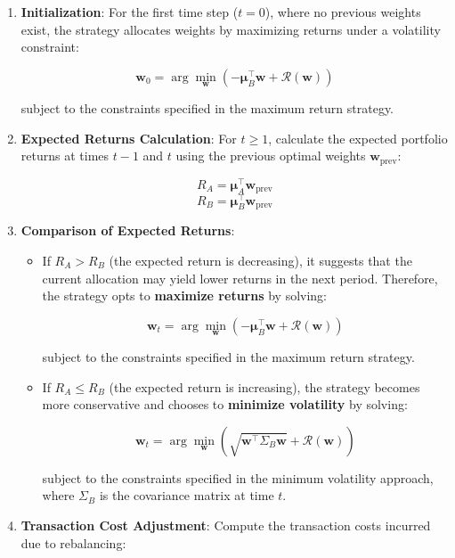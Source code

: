\begin{enumerate}
    \item \textbf{Initialization}: For the first time step (\( t = 0 \)), where no previous weights exist, the strategy allocates weights by maximizing returns under a volatility constraint:

    \[
    \mathbf{w}_0 = \arg\min_{\mathbf{w}} \left( -\boldsymbol{\mu}_B^\top \mathbf{w} + \mathcal{R}(\mathbf{w}) \right)
    \]
    
    subject to the constraints specified in the maximum return strategy.

    \item \textbf{Expected Returns Calculation}: For \( t \geq 1 \), calculate the expected portfolio returns at times \( t-1 \) and \( t \) using the previous optimal weights \( \mathbf{w}_{\text{prev}} \):

    \[
    R_A = \boldsymbol{\mu}_A^\top \mathbf{w}_{\text{prev}}
    \]
    \[
    R_B = \boldsymbol{\mu}_B^\top \mathbf{w}_{\text{prev}}
    \]

    \item \textbf{Comparison of Expected Returns}:
    \begin{itemize}
        \item If \( R_A > R_B \) (the expected return is decreasing), it suggests that the current allocation may yield lower returns in the next period. Therefore, the strategy opts to \textbf{maximize returns} by solving:

        \[
        \mathbf{w}_t = \arg\min_{\mathbf{w}} \left( -\boldsymbol{\mu}_B^\top \mathbf{w} + \mathcal{R}(\mathbf{w}) \right)
        \]
        
        subject to the constraints specified in the maximum return strategy.

        \item If \( R_A \leq R_B \) (the expected return is increasing), the strategy becomes more conservative and chooses to \textbf{minimize volatility} by solving:

        \[
        \mathbf{w}_t = \arg\min_{\mathbf{w}} \left( \sqrt{\mathbf{w}^\top \Sigma_B \mathbf{w}} + \mathcal{R}(\mathbf{w}) \right)
        \]
        
        subject to the constraints specified in the minimum volatility approach, where \( \Sigma_B \) is the covariance matrix at time \( t \).
    \end{itemize}

    \item \textbf{Transaction Cost Adjustment}: Compute the transaction costs incurred due to rebalancing:


\end{enumerate}
